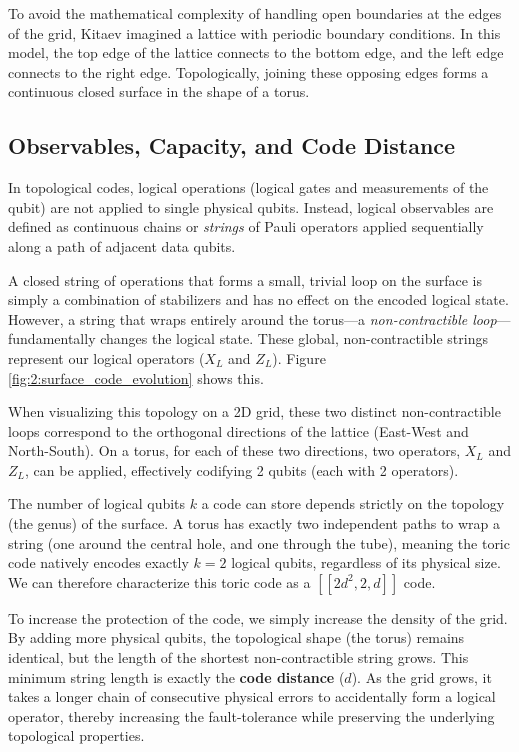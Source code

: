 To avoid the mathematical complexity of handling open boundaries at the edges of the grid, Kitaev imagined a lattice with periodic boundary conditions. In this model, the top edge of the lattice connects to the bottom edge, and the left edge connects to the right edge. Topologically, joining these opposing edges forms a continuous closed surface in the shape of a torus. 

\subsection{Observables, Capacity, and Code Distance}
In topological codes, logical operations (logical gates and measurements of the qubit) are not applied to single physical qubits. Instead, logical observables are defined as continuous chains or \textit{strings} of Pauli operators applied sequentially along a path of adjacent data qubits. 

A closed string of operations that forms a small, trivial loop on the surface is simply a combination of stabilizers and has no effect on the encoded logical state. However, a string that wraps entirely around the torus---a \textit{non-contractible loop}---fundamentally changes the logical state. These global, non-contractible strings represent our logical operators ($X_L$ and $Z_L$). Figure \ref{fig:2:surface_code_evolution} shows this.

When visualizing this topology on a 2D grid, these two distinct non-contractible loops correspond to the orthogonal directions of the lattice (East-West and North-South). On a torus, for each of these two directions, two operators, $X_L$ and $Z_L$, can be applied, effectively codifying 2 qubits (each with 2 operators).

The number of logical qubits $k$ a code can store depends strictly on the topology (the genus) of the surface. A torus has exactly two independent paths to wrap a string (one around the central hole, and one through the tube), meaning the toric code natively encodes exactly $k=2$ logical qubits, regardless of its physical size. We can therefore characterize this toric code as a $[[2d^2, 2, d]]$ code.

To increase the protection of the code, we simply increase the density of the grid. By adding more physical qubits, the topological shape (the torus) remains identical, but the length of the shortest non-contractible string grows. This minimum string length is exactly the \textbf{code distance} ($d$). As the grid grows, it takes a longer chain of consecutive physical errors to accidentally form a logical operator, thereby increasing the fault-tolerance while preserving the underlying topological properties.


